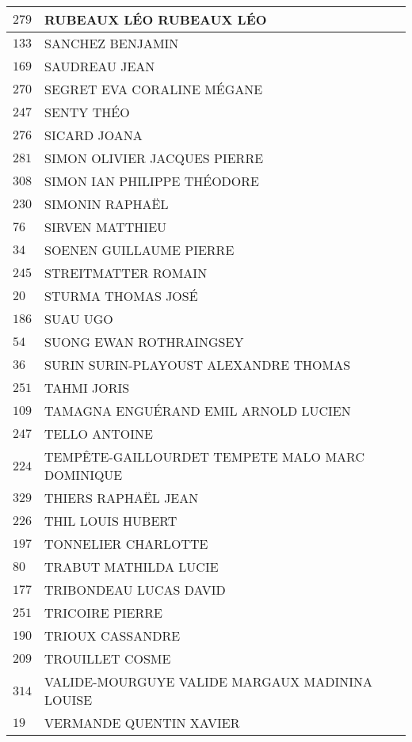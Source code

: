 \begin{xltabular}{\linewidth}{|l|X|}
    \hline
    $279$ & RUBEAUX LÉO RUBEAUX LÉO \\
    \hline
    $133$ & SANCHEZ BENJAMIN \\
    \hline
    $169$ & SAUDREAU JEAN \\
    \hline
    $270$ & SEGRET EVA CORALINE MÉGANE \\
    \hline
    $247$ & SENTY THÉO \\
    \hline
    $276$ & SICARD JOANA \\
    \hline
    $281$ & SIMON OLIVIER JACQUES PIERRE \\
    \hline
    $308$ & SIMON IAN PHILIPPE THÉODORE \\
    \hline
    $230$ & SIMONIN RAPHAËL \\
    \hline
    $76$ & SIRVEN MATTHIEU \\
    \hline
    $34$ & SOENEN GUILLAUME PIERRE \\
    \hline
    $245$ & STREITMATTER ROMAIN \\
    \hline
    $20$ & STURMA THOMAS JOSÉ \\
    \hline
    $186$ & SUAU UGO \\
    \hline
    $54$ & SUONG EWAN ROTHRAINGSEY \\
    \hline
    $36$ & SURIN SURIN-PLAYOUST ALEXANDRE THOMAS \\
    \hline
    $251$ & TAHMI JORIS \\
    \hline
    $109$ & TAMAGNA ENGUÉRAND EMIL ARNOLD LUCIEN \\
    \hline
    $247$ & TELLO ANTOINE \\
    \hline
    $224$ & TEMPÊTE-GAILLOURDET TEMPETE MALO MARC DOMINIQUE \\
    \hline
    $329$ & THIERS RAPHAËL JEAN \\
    \hline
    $226$ & THIL LOUIS HUBERT \\
    \hline
    $197$ & TONNELIER CHARLOTTE \\
    \hline
    $80$ & TRABUT MATHILDA LUCIE \\
    \hline
    $177$ & TRIBONDEAU LUCAS DAVID \\
    \hline
    $251$ & TRICOIRE PIERRE \\
    \hline
    $190$ & TRIOUX CASSANDRE \\
    \hline
    $209$ & TROUILLET COSME \\
    \hline
    $314$ & VALIDE-MOURGUYE VALIDE MARGAUX MADININA LOUISE \\
    \hline
    $19$ & VERMANDE QUENTIN XAVIER \\

\end{xltabular}
